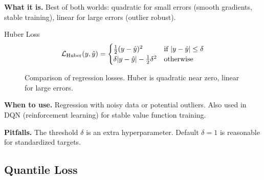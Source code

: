 \textbf{What it is.} Best of both worlds: quadratic for small errors (smooth gradients, stable training), linear for large errors (outlier robust).

\begin{mathresult}{Huber Loss}
\begin{equation}
\mathcal{L}_{\text{Huber}}(y, \hat{y}) = \begin{cases}
\frac{1}{2}(y - \hat{y})^2 & \text{if } |y - \hat{y}| \leq \delta \\
\delta|y - \hat{y}| - \frac{1}{2}\delta^2 & \text{otherwise}
\end{cases}
\end{equation}
\end{mathresult}

\begin{figure}[H]
\centering
{}
\caption{Comparison of regression losses. Huber is quadratic near zero, linear for large errors.}
\end{figure}

\textbf{When to use.} Regression with noisy data or potential outliers. Also used in DQN (reinforcement learning) for stable value function training.

\textbf{Pitfalls.} The threshold $\delta$ is an extra hyperparameter. Default $\delta = 1$ is reasonable for standardized targets.

\subsection{Quantile Loss}

